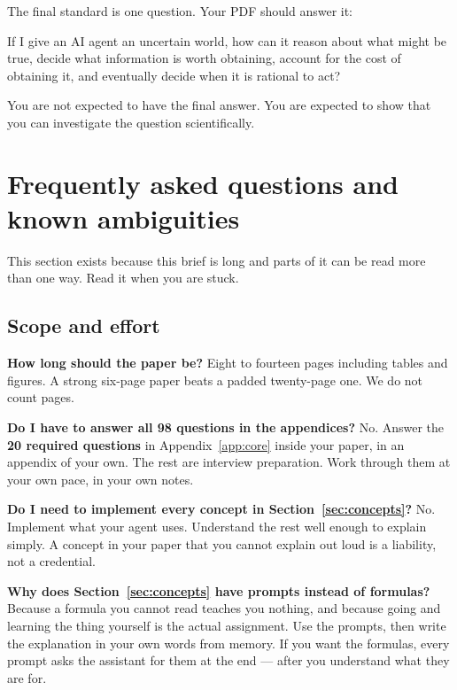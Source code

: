 \documentclass[11pt,a4paper]{article}
\begin{document}
The final standard is one question. Your PDF should answer it:

\begin{sbrule}
If I give an AI agent an uncertain world, how can it reason about what might be true, decide what
information is worth obtaining, account for the cost of obtaining it, and eventually decide when
it is rational to act?
\end{sbrule}

You are not expected to have the final answer. You are expected to show that you can investigate
the question scientifically.

\section{Frequently asked questions and known ambiguities}
\label{sec:faq}

This section exists because this brief is long and parts of it can be read more than one way.
Read it when you are stuck.

\subsection{Scope and effort}

\textbf{How long should the paper be?} Eight to fourteen pages including tables and figures. A
strong six-page paper beats a padded twenty-page one. We do not count pages.

\textbf{Do I have to answer all 98 questions in the appendices?} No. Answer the \textbf{20 required
questions} in Appendix~\ref{app:core} inside your paper, in an appendix of your own. The rest are
interview preparation. Work through them at your own pace, in your own notes.

\textbf{Do I need to implement every concept in Section~\ref{sec:concepts}?} No. Implement what
your agent uses. Understand the rest well enough to explain simply. A concept in your paper that
you cannot explain out loud is a liability, not a credential.

\textbf{Why does Section~\ref{sec:concepts} have prompts instead of formulas?} Because a formula
you cannot read teaches you nothing, and because going and learning the thing yourself is the
actual assignment. Use the prompts, then write the explanation in your own words from memory. If
you want the formulas, every prompt asks the assistant for them at the end --- after you
understand what they are for.
\end{document}
